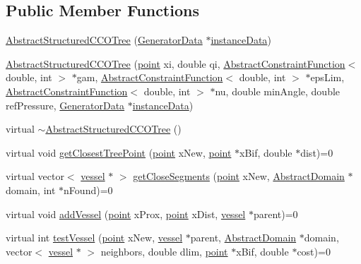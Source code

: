 \subsection*{Public Member Functions}
\begin{DoxyCompactItemize}
\item 
\hyperlink{class_abstract_structured_c_c_o_tree_a0a7c83918e4ed64d8e7d371e1c90e4a1}{Abstract\+Structured\+C\+C\+O\+Tree} (\hyperlink{class_generator_data}{Generator\+Data} $\ast$\hyperlink{class_abstract_structured_c_c_o_tree_af1836d7ed2156f3cf9cc311edfdc49b1}{instance\+Data})
\item 
\hyperlink{class_abstract_structured_c_c_o_tree_aafb34c1fbc00f683908dc933ae333599}{Abstract\+Structured\+C\+C\+O\+Tree} (\hyperlink{structpoint}{point} xi, double qi, \hyperlink{class_abstract_constraint_function}{Abstract\+Constraint\+Function}$<$ double, int $>$ $\ast$gam, \hyperlink{class_abstract_constraint_function}{Abstract\+Constraint\+Function}$<$ double, int $>$ $\ast$eps\+Lim, \hyperlink{class_abstract_constraint_function}{Abstract\+Constraint\+Function}$<$ double, int $>$ $\ast$nu, double min\+Angle, double ref\+Pressure, \hyperlink{class_generator_data}{Generator\+Data} $\ast$\hyperlink{class_abstract_structured_c_c_o_tree_af1836d7ed2156f3cf9cc311edfdc49b1}{instance\+Data})
\item 
virtual \hyperlink{class_abstract_structured_c_c_o_tree_a0b1829c729e83d1e577ad8724e5298a7}{$\sim$\+Abstract\+Structured\+C\+C\+O\+Tree} ()
\item 
virtual void \hyperlink{class_abstract_structured_c_c_o_tree_a09cb70d5e23065273d87dd0c0434e1c5}{get\+Closest\+Tree\+Point} (\hyperlink{structpoint}{point} x\+New, \hyperlink{structpoint}{point} $\ast$x\+Bif, double $\ast$dist)=0
\item 
virtual vector$<$ \hyperlink{structvessel}{vessel} $\ast$ $>$ \hyperlink{class_abstract_structured_c_c_o_tree_a0371a4c9a5e8ddfd8b0cc8d811d60f04}{get\+Close\+Segments} (\hyperlink{structpoint}{point} x\+New, \hyperlink{class_abstract_domain}{Abstract\+Domain} $\ast$domain, int $\ast$n\+Found)=0
\item 
virtual void \hyperlink{class_abstract_structured_c_c_o_tree_af592741d1d89d62834e9d58a72cb40af}{add\+Vessel} (\hyperlink{structpoint}{point} x\+Prox, \hyperlink{structpoint}{point} x\+Dist, \hyperlink{structvessel}{vessel} $\ast$parent)=0
\item 
virtual int \hyperlink{class_abstract_structured_c_c_o_tree_ac566ae7f8357ce1f61f624d87a9daf86}{test\+Vessel} (\hyperlink{structpoint}{point} x\+New, \hyperlink{structvessel}{vessel} $\ast$parent, \hyperlink{class_abstract_domain}{Abstract\+Domain} $\ast$domain, vector$<$ \hyperlink{structvessel}{vessel} $\ast$ $>$ neighbors, double dlim, \hyperlink{structpoint}{point} $\ast$x\+Bif, double $\ast$cost)=0

\end{DoxyCompactItemize}
